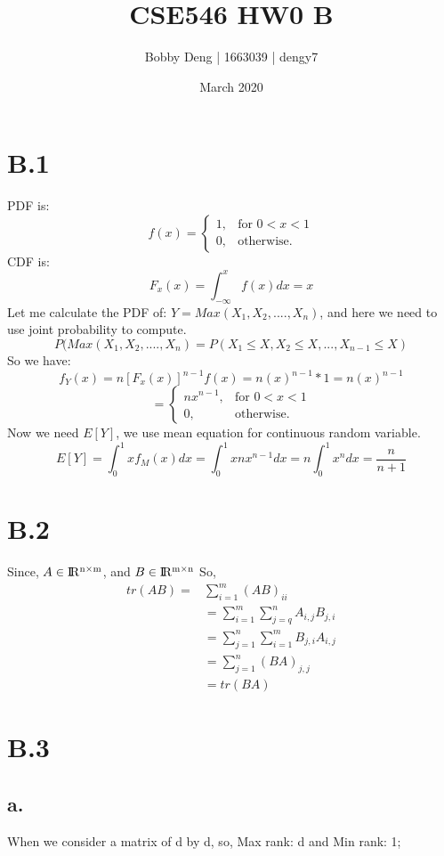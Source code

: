 \documentclass{article}
\title{CSE546 HW0 B}
\author{Bobby Deng | 1663039 | dengy7 }
\date{March 2020}
\begin{document}
\maketitle

\section*{B.1}
PDF is:\newline
\[ 
f(x) = \begin{cases}
1, & \text{for $0 < x < 1$} \\
0, & \text{otherwise.}
\end{cases} 
\]
CDF is:
\[ F_x(x)=\int_{-\infty}^{x}f(x)dx=x \]
Let me calculate the PDF of: $Y=Max(X_1,X_2,....,X_n)$, and here we need to use joint probability to compute.
\[ P(Max(X_1,X_2,....,X_n) = P(X_1\le X,X_2\le X,...,X_{n-1}\le X) \]
So we have:
\[ f_Y(x)=n[F_x(x)]^{n-1}f(x)=n(x)^{n-1}*1=n(x)^{n-1} \]
\[ 
=\begin{cases}
nx^{n-1}, & \text{for $0 < x < 1$} \\
0, & \text{otherwise.}
\end{cases} 
\]
Now we need $E[Y]$, we use mean equation for continuous random variable. 
\[ E[Y]=\int_0^1xf_M(x)dx=\int_0^1xnx^{n-1}dx=n\int_0^1x^ndx=\frac{n}{n+1} \]


\section*{B.2}
Since, $A\in \rm I\!R^{n \times m}$, and $B\in \rm I\!R^{m \times n}$
So,
\begin{equation}
\begin{split}
tr(AB) = & \sum_{i=1}^m (AB)_{ii} \\
& = \sum_{i=1}^m \sum_{j=q}^n A_{i,j}B_{j,i} \\
& = \sum_{j=1}^n \sum_{i=1}^m B_{j,i}A_{i,j} \\
& = \sum_{j=1}^n (BA)_{j,j} \\
& = tr(BA)
\end{split}
\end{equation}

\section*{B.3}
\subsection*{a.}
When we consider a matrix of d by d, so, \newline
Max rank: d and Min rank: 1; 
\end{document}
